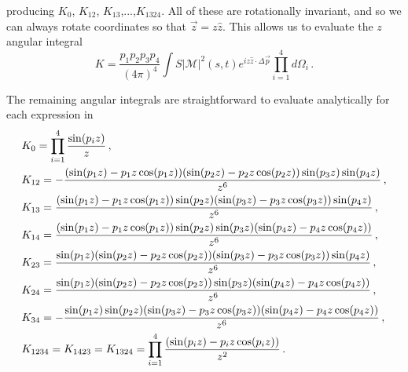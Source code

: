 producing $K_0$, $K_{12}$, $K_{13}$,...,$K_{1324}$.  All of these are rotationally invariant, and so we can always rotate coordinates so that $\vec z=z\hat z$.  This allows us to evaluate the $z$ angular integral
\begin{equation}
K=\frac{p_1p_2p_3p_4}{(4\pi)^4}\int S|\mathcal{M}|^2(s,t)e^{iz \hat z\cdot\Delta\vec p}\prod_{i=1}^4d\Omega_i\,.
\end{equation}

The remaining angular integrals are straightforward to evaluate analytically for each expression in 
\begin{align}
&K_0=\prod_{i=1}^4\frac{\sin(p_iz)}{z}\,,\\
&K_{12}=-\frac{(\sin(p_1z)-p_1z\cos(p_1z))(\sin(p_2z)-p_2z\cos(p_2z))\sin(p_3z)\sin(p_4z)}{z^6}\,,\notag\\
&K_{13}=\frac{(\sin(p_1z)-p_1z\cos(p_1z))\sin(p_2z)(\sin(p_3z)-p_3z\cos(p_3z))\sin(p_4z)}{z^6}\,,\notag\\
&K_{14}=\frac{(\sin(p_1z)-p_1z\cos(p_1z))\sin(p_2z)\sin(p_3z)(\sin(p_4z)-p_4z\cos(p_4z))}{z^6}\,,\notag\\
&K_{23}=\frac{\sin(p_1z)(\sin(p_2z)-p_2z\cos(p_2z))(\sin(p_3z)-p_3z\cos(p_3z))\sin(p_4z)}{z^6}\,,\notag\\
&K_{24}=\frac{\sin(p_1z)(\sin(p_2z)-p_2z\cos(p_2z))\sin(p_3z)(\sin(p_4z)-p_4z\cos(p_4z))}{z^6}\,,\notag\\
&K_{34}=-\frac{\sin(p_1z)\sin(p_2z)(\sin(p_3z)-p_3z\cos(p_3z))(\sin(p_4z)-p_4z\cos(p_4z))}{z^6}\,,\notag\\
&K_{1234}=K_{1423}=K_{1324}=\prod_{i=1}^4\frac{(\sin(p_iz)-p_iz\cos(p_iz))}{z^2}\,.\notag
\end{align}

